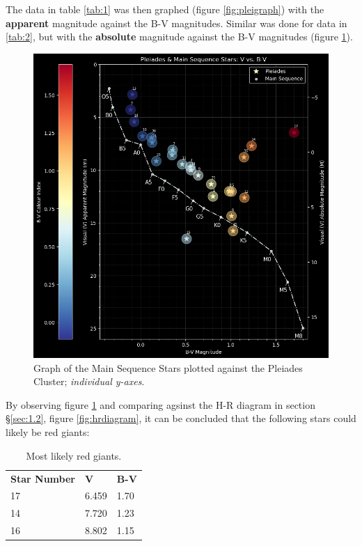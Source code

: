 \documentclass[12pt]{article}
\begin{document}
The data in table \ref{tab:1} was then graphed (figure \ref{fig:pleigraph}) with the \textbf{apparent} magnitude against the B-V magnitudes. Similar was done for data in \ref{tab:2}, but with 
the \textbf{absolute} magnitude against the B-V magnitudes (figure \ref{fig:pleimsgraph}).

\begin{figure}[H]
    \centering
    \includegraphics[width=12.5cm]{pleiadesms graph.png}
    \caption{\centering Graph of the Main Sequence Stars plotted against the Pleiades Cluster; \textit{individual y-axes}.}
    \label{fig:pleimsgraph}
\end{figure}

By observing figure \ref{fig:pleimsgraph} and comparing agsinst the H-R diagram in section §\ref{sec:1.2}, figure \ref{fig:hrdiagram}, it can be concluded that the following stars could likely be red giants:

\begin{table}[H]
    \centering
    \caption{\centering Most likely red giants.}
    \begin{tabular}{p{3cm}|p{1.5cm} p{1.5cm} }
    \textbf{Star Number} & \textbf{V} & \textbf{B-V} \\
    17                   & 6.459      & 1.70         \\
    14                   & 7.720      & 1.23         \\
    16                   & 8.802      & 1.15        
    \end{tabular}
    \label{tab:3}
\end{table}
\end{document}

